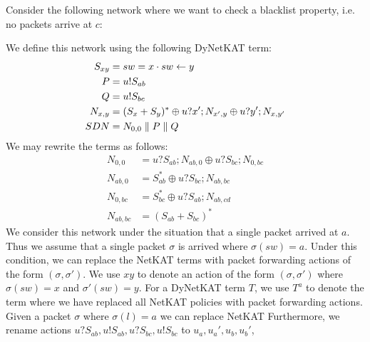 \begin{example}
    Consider the following network where we want to check a blacklist
    property, i.e. no packets arrive at $c$:
    \begin{center}
    \end{center}
    We define this network using the following DyNetKAT term:
    \begin{align*}
        S_{xy}  & = sw = x \cdot sw \leftarrow y            \\
        P       & = u!S_{ab}                         \\
        Q       & = u!S_{bc}                         \\
        N_{x,y} & = (S_x+S_y)^* \oplus u?x';N_{x',y}
        \oplus u?y';N_{x,y'}                         \\
        SDN     & = N_{0,0} \parallel P \parallel Q
    \end{align*}
    We may rewrite the terms as follows:
    \begin{align*}
        N_{0,0}   & = u?S_{ab};N_{ab,0} \oplus u?S_{bc};N_{0,bc} \\
        N_{ab,0}  & = S_{ab}^* \oplus u?S_{bc};N_{ab,bc}         \\
        N_{0,bc}  & = S_{bc}^* \oplus u?S_{ab};N_{ab,cd}         \\
        N_{ab,bc} & = (S_{ab}+S_{bc})^*
    \end{align*}
    We consider this network under the situation that a single packet
    arrived at $a$.
    Thus we assume that a single packet $\sigma$ is arrived where
    $\sigma(sw) = a$.
    Under this condition, we can replace the NetKAT terms with
    packet forwarding actions of the form $(\sigma, \sigma')$.
    We use $xy$ to denote an action of the form $(\sigma,\sigma')$
    where $\sigma(sw) = x$ and $\sigma'(sw) = y$.
    For a DyNetKAT term $T$, we use $T^a$ to denote the term where
    we have replaced all NetKAT policies with packet forwarding actions.
    Given a packet $\sigma$ where $\sigma(l) = a$ we can replace NetKAT
    Furthermore, we rename actions
    $u?S_{ab},u!S_{ab},u?S_{bc},u!S_{bc}$ to $u_a,u_a',u_b,u_b'$,

\end{example}
